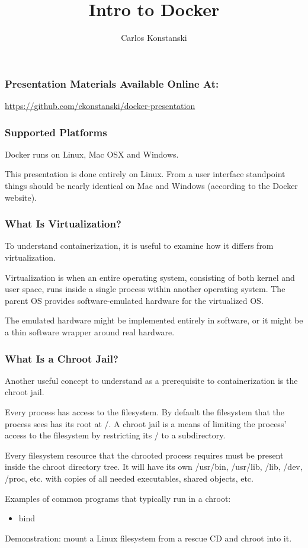 \documentclass[helvetica,english,utf8,notitle,nologo]{beamer}
\begin{document}
\title{Intro to Docker}
\author{Carlos Konstanski}

\frame{\titlepage}

\begin{frame}
  \frametitle{Presentation Materials Available Online At:}
  \href{url}{https://github.com/ckonstanski/docker-presentation}
\end{frame}

\begin{frame}
  \frametitle{Supported Platforms}

  Docker runs on Linux, Mac OSX and Windows. 

  This presentation is done entirely on Linux. From a user interface
  standpoint things should be nearly identical on Mac and Windows
  (according to the Docker website).
\end{frame}

\begin{frame}
  \frametitle{What Is Virtualization?}

  To understand containerization, it is useful to examine how it
  differs from virtualization.

  Virtualization is when an entire operating system, consisting of
  both kernel and user space, runs inside a single process within
  another operating system. The parent OS provides software-emulated
  hardware for the virtualized OS.

  The emulated hardware might be implemented entirely in software, or
  it might be a thin software wrapper around real hardware.
\end{frame}

\begin{frame}
  \frametitle{What Is a Chroot Jail?}

  Another useful concept to understand as a prerequisite to
  containerization is the chroot jail.

  Every process has access to the filesystem. By default the
  filesystem that the process sees has its root at /. A chroot jail is
  a means of limiting the process' access to the filesystem by
  restricting its / to a subdirectory.

  Every filesystem resource that the chrooted process requires must be
  present inside the chroot directory tree. It will have its own
  /usr/bin, /usr/lib, /lib, /dev, /proc, etc. with copies of all
  needed executables, shared objects, etc.

  Examples of common programs that typically run in a chroot:

  \begin{itemize}
  \item bind
  
  \end{itemize}

  Demonstration: mount a Linux filesystem from a rescue CD and chroot
  into it.
\end{frame}
\end{document}
